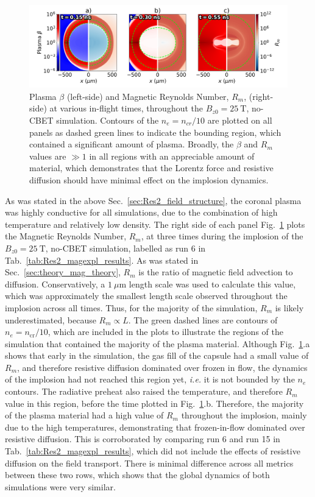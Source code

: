 \begin{figure}[t!]
    \includegraphics[width=\linewidth]{Results2/Images/magmag_beta_Rm.png}
    \centering
    \caption{Plasma $\beta$ (left-side) and Magnetic Reynolds Number, $R_m$, (right-side) at various in-flight times, throughout the $B_{z0}=25\ \text{T}$, no-\ac{CBET} simulation.
    Contours of the $n_e=n_{cr}/10$ are plotted on all panels as dashed green lines to indicate the bounding region, which contained a significant amount of plasma.
    Broadly, the $\beta$ and $R_m$ values are $\gg 1$ in all regions with an appreciable amount of material, which demonstrates that the Lorentz force and resistive diffusion should have minimal effect on the implosion dynamics.}%
    \label{fig:Res2_magmag_beta_Rm}
\end{figure}

As was stated in the above Sec.~\ref{sec:Res2_field_structure}, the coronal plasma was highly conductive for all simulations, due to the combination of high temperature and relatively low density.
The right side of each panel Fig.~\ref{fig:Res2_magmag_beta_Rm} plots the Magnetic Reynolds Number, $R_m$, at three times during the implosion of the $B_{z0}=25\ \text{T}$, no-\ac{CBET} simulation, labelled as run 6 in Tab.~\ref{tab:Res2_magexpl_results}.
As was stated in Sec.~\ref{sec:theory_mag_theory}, $R_m$ is the ratio of magnetic field advection to diffusion.
Conservatively, a $1\ \mu\text{m}$ length scale was used to calculate this value, which was approximately the smallest length scale observed throughout the implosion across all times.
Thus, for the majority of the simulation, $R_m$ is likely underestimated, because $R_m\propto L$.
The green dashed lines are contours of $n_e=n_{\text{cr}}/10$, which are included in the plots to illustrate the regions of the simulation that contained the majority of the plasma material.
Although Fig.~\ref{fig:Res2_magmag_beta_Rm}.a shows that early in the simulation, the gas fill of the capsule had a small value of $R_m$, and therefore resistive diffusion dominated over frozen in flow, the dynamics of the implosion had not reached this region yet, \textit{i.e.} it is not bounded by the $n_e$ contours.
The radiative preheat also raised the temperature, and therefore $R_m$ value in this region, before the time plotted in Fig.~\ref{fig:Res2_magmag_beta_Rm}.b.
Therefore, the majority of the plasma material had a high value of $R_m$ throughout the implosion, mainly due to the high temperatures, demonstrating that frozen-in-flow dominated over resistive diffusion.
This is corroborated by comparing run 6 and run 15 in Tab.~\ref{tab:Res2_magexpl_results}, which did not include the effects of resistive diffusion on the field transport.
There is minimal difference across all metrics between these two rows, which shows that the global dynamics of both simulations were very similar.


